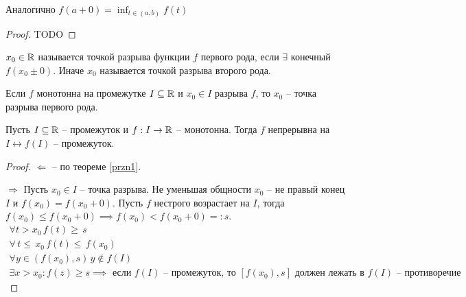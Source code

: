\begin{proposition}
	Аналогично $ f(a +0) = \inf_{t \in (a, b)}f(t) $
\end{proposition}
\begin{proof}
	TODO
\end{proof}
\begin{definition}
	 $ x_0 \in \mathbb{R} $ называется точкой разрыва функции $ f $ первого рода, если $ \exists  $ конечный $ f(x_0 \pm 0) $. Иначе $ x_0 $ называется точкой разрыва второго рода.
\end{definition}
\begin{corollary}
	Если $ f $ монотонна на промежутке $ I \subseteq \mathbb{R} $ и $ x_0\in I $ разрыва $ f $, то $ x_0 $ -- точка разрыва первого рода.
\end{corollary}
\begin{theorem}
	Пусть $ I \subseteq \mathbb{R} $ -- промежуток и $ f: I \to  \mathbb{R} $ -- монотонна. Тогда $ f $ непрерывна на $ I \longleftrightarrow f(I)$ -- промежуток.
\end{theorem} \begin{proof}
	 $ \Leftarrow $ -- по теореме \ref{przn1}. 

	 $ \Rightarrow $ Пусть $ x_0 \in I $ -- точка разрыва. Не уменьшая общности $ x_0 $ -- не правый конец $ I $ и $ f(x_0) = f(x_0 + 0) $. Пусть $ f $ нестрого возрастает на $ I $, тогда $ f(x_0) \leq f(x_0 + 0) \implies f(x_0) < f(x_0 + 0) =: s$. \begin{gather}
		\forall t > x_0\, f(t) \geq\, s \\
		\forall\, t \leq\, x_0\, f(t) \leq\, f(x_0) \\ 
		\forall y \in (f(x_0), s)\, y \notin f(I) \\
		\exists x > x_0: f(z) \geq s \implies \text{ если } f(I) \text{ -- промежуток, то } [f(x_0), s] \text{ должен лежать в  } f(I) \text{ -- противоречие }
	 \end{gather}
	 
\end{proof}